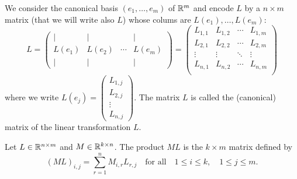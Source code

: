 \documentclass[11pt,nocut]{article}
\begin{document}
We consider the canonical basis $(e_1, \dots, e_m)$ of $\mathbb{R}^m$ and encode $L$ by a $n \times m$ matrix (that we will write also $L$) whose colums are $L(e_1), \dots, L(e_m)$:
$$
L =
\begin{pmatrix}
	| & | & & | \\
	L(e_1) & L(e_2) & \cdots& L(e_m) \\
	| & | & & |
\end{pmatrix}
= 
\begin{pmatrix}
	L_{1,1} & L_{1,2} & \cdots & L_{1,m} \\
	L_{2,1} & L_{2,2} & \cdots & L_{2,m} \\
	\vdots & \vdots & \ddots & \vdots \\
	L_{n,1} & L_{n,2} & \cdots & L_{n,m} \\
\end{pmatrix}
$$
where we write $L(e_j) = 
\begin{pmatrix}
	L_{1,j} \\
	L_{2,j}\\
	\vdots \\
	L_{n,j}
\end{pmatrix}$.
The matrix $L$ is called the (canonical) matrix of the linear transformation $L$.

\begin{definition}
	Let $L \in \mathbb{R}^{n \times m}$ and $M \in \mathbb{R}^{k \times n}$. The product $M L$ is the $k \times m$ matrix defined by
	$$
	(ML)_{i,j} = \sum_{r=1}^n M_{i,r} L_{r,j} \quad \text{for all} \quad 1 \leq i \leq k, \quad 1 \leq j \leq m.
	$$
\end{definition}

\begin{proposition}
\end{proposition}


	\vspace{1cm}
	\centerline{}

%
%
\end{document}
